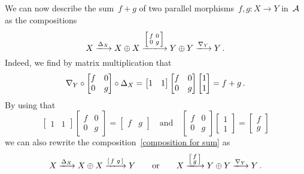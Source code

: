 \begin{remark}
  We can now describe the sum~$f + g$ of two parallel morphisms~$f, g \colon X \to Y$ in~$\mathcal{A}$ as the compositions
  \begin{equation}
    \label{composition for sum}
      X
    \xlongto{\diag_X}
      X \oplus X
    \xlongto{\begin{bsmallmatrix} f & 0 \\ 0 & g \end{bsmallmatrix}}
      Y \oplus Y
    \xlongto{\codiag_Y}
      Y \,.
  \end{equation}
  Indeed, we find by matrix multiplication that
  \[
      \nabla_Y
      \circ
      \begin{bmatrix}
        f & 0 \\
        0 & g
      \end{bmatrix}
      \circ
      \Delta_X
    = \begin{bmatrix}
        1 & 1
      \end{bmatrix}
      \begin{bmatrix}
        f & 0 \\
        0 & g
      \end{bmatrix}
      \begin{bmatrix}
        1 \\
        1
      \end{bmatrix}
    = f + g \,.
  \]
  By using that
  \[
    \begin{bmatrix}
      1 & 1
    \end{bmatrix}
    \begin{bmatrix}
      f & 0 \\
      0 & g
    \end{bmatrix}
    =
    \begin{bmatrix}
      f & g
    \end{bmatrix}
    \quad\text{and}\quad
    \begin{bmatrix}
      f & 0 \\
      0 & g
    \end{bmatrix}
    \begin{bmatrix}
      1 \\
      1
    \end{bmatrix}
    =
    \begin{bmatrix}
      f \\
      g
    \end{bmatrix}
  \]
  we can also rewrite the composition~\eqref{composition for sum} as
  \[
      X
    \xlongto{\diag_X}
      X \oplus X
    \xlongto{\begin{bsmallmatrix} f & g \end{bsmallmatrix}}
      Y
    \qquad\text{or}\qquad
      X
    \xlongto{\begin{bsmallmatrix} f \\ g \end{bsmallmatrix}}
      Y \oplus Y
    \xlongto{\codiag_Y}
      Y \,.
  \]
  

\end{remark}
